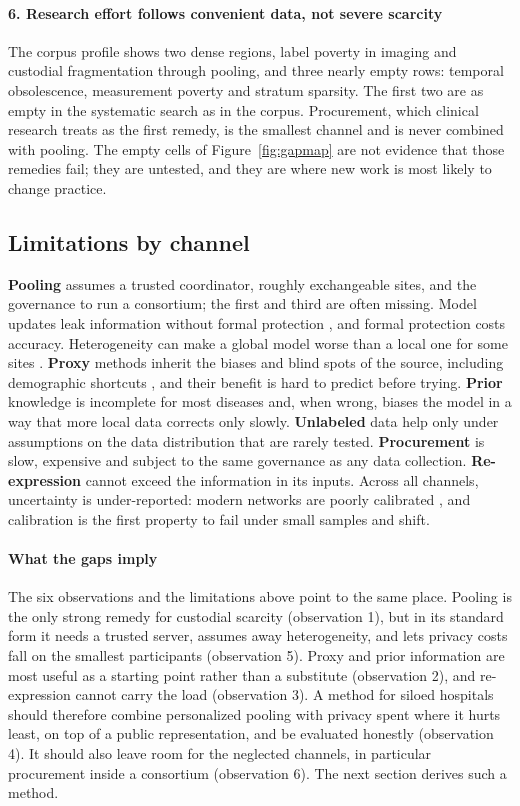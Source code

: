 \documentclass[acmsmall,screen,review]{acmart}
\theoremstyle{acmdefinition}
\begin{document}
\paragraph{6. Research effort follows convenient data, not severe scarcity} The corpus profile shows two dense regions, label poverty in imaging and custodial fragmentation through pooling, and three nearly empty rows: temporal obsolescence, measurement poverty and stratum sparsity. The first two are as empty in the systematic search as in the corpus. Procurement, which clinical research treats as the first remedy, is the smallest channel and is never combined with pooling. The empty cells of Figure~\ref{fig:gapmap} are not evidence that those remedies fail; they are untested, and they are where new work is most likely to change practice.

\subsection{Limitations by channel}\label{sec:S7_3}

 \textbf{Pooling} assumes a trusted coordinator, roughly exchangeable sites, and the governance to run a consortium; the first and third are often missing. Model updates leak information without formal protection \cite{geiping2020inverting,zhu2019deep}, and formal protection costs accuracy. Heterogeneity can make a global model worse than a local one for some sites \cite{hsieh2020non}. \textbf{Proxy} methods inherit the biases and blind spots of the source, including demographic shortcuts \cite{gichoya2022ai}, and their benefit is hard to predict before trying. \textbf{Prior} knowledge is incomplete for most diseases and, when wrong, biases the model in a way that more local data corrects only slowly. \textbf{Unlabeled} data help only under assumptions on the data distribution that are rarely tested. \textbf{Procurement} is slow, expensive and subject to the same governance as any data collection. \textbf{Re-expression} cannot exceed the information in its inputs. Across all channels, uncertainty is under-reported: modern networks are poorly calibrated \cite{guo2017calibration}, and calibration is the first property to fail under small samples and shift.

\paragraph{What the gaps imply} The six observations and the limitations above point to the same place. Pooling is the only strong remedy for custodial scarcity (observation 1), but in its standard form it needs a trusted server, assumes away heterogeneity, and lets privacy costs fall on the smallest participants (observation 5). Proxy and prior information are most useful as a starting point rather than a substitute (observation 2), and re-expression cannot carry the load (observation 3). A method for siloed hospitals should therefore combine personalized pooling with privacy spent where it hurts least, on top of a public representation, and be evaluated honestly (observation 4). It should also  leave room for the neglected channels, in particular procurement inside a consortium (observation 6). The next section derives such a method.
\end{document}
